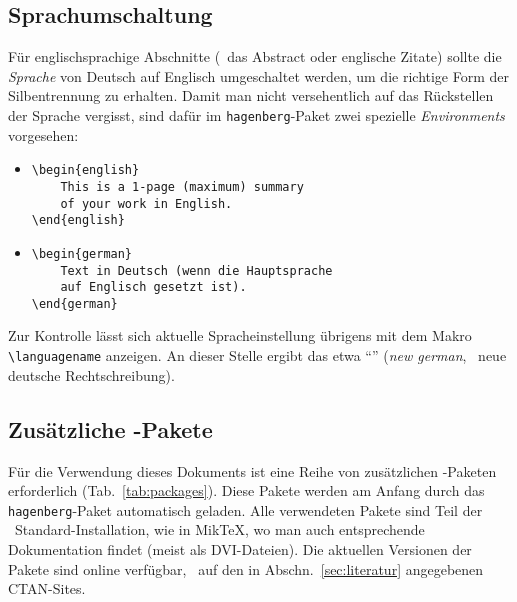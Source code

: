 \subsection{Sprachumschaltung}
\label{sec:sprachumschaltung}

Für englischsprachige Abschnitte (\zB\ das Abstract oder englische
Zitate) sollte die \emph{Sprache} von Deutsch auf Englisch
umgeschaltet werden, um die richtige Form der Silbentrennung zu
erhalten. Damit man nicht versehentlich auf das Rückstellen der
Sprache vergisst, sind dafür im \texttt{hagenberg}-Paket zwei
spezielle \emph{Environments} vorgesehen:
%
\begin{itemize}
\item[] 
\verb!\begin{english}!\\
\verb!    This is a 1-page (maximum) summary!\\
\verb!    of your work in English.!\\
\verb!\end{english}!
\end{itemize}

\begin{itemize}
\item[] 
\verb!\begin{german}!\\
\verb!    Text in Deutsch (wenn die Hauptsprache!\\
\verb!    auf Englisch gesetzt ist).!\\
\verb!\end{german}!
\end{itemize}
%
Zur Kontrolle lässt sich aktuelle Spracheinstellung übrigens mit dem Makro \verb!\languagename!
anzeigen. An dieser Stelle ergibt das etwa "`\texttt{\languagename}"' (\emph{new german}, \dah\ neue deutsche Rechtschreibung).


\subsection{Zusätzliche {\latex}-Pakete}

Für die Verwendung dieses Dokuments ist eine Reihe von
zusätzlichen \latex-Paketen erforderlich
(Tab.~\ref{tab:packages}). Diese Pakete werden am Anfang
durch das \texttt{hagenberg}-Paket automatisch geladen. 
Alle verwendeten Pakete sind
Teil der \latex\ Standard-Installation, wie \zB in MikTeX, wo
man auch entsprechende Dokumentation findet (meist als DVI-Dateien).
Die aktuellen Versionen der Pakete sind online verfügbar, \ua\ auf den
in Abschn.~\ref{sec:literatur} angegebenen CTAN-Sites.

